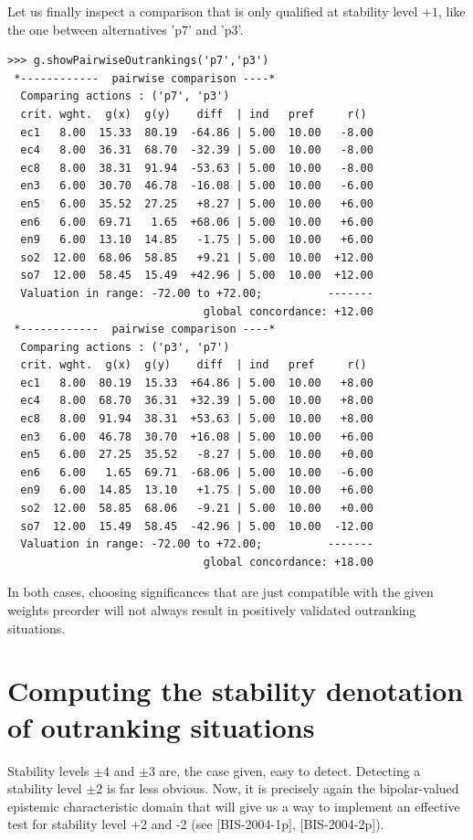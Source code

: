 Let us finally inspect a comparison that is only qualified at stability level $+1$, like the one between alternatives 'p7' and 'p3'.
\begin{lstlisting}[caption={Comparison of alternatives 'p7' and 'p3'},label=list:19.6]
>>> g.showPairwiseOutrankings('p7','p3')
 *------------  pairwise comparison ----*
  Comparing actions : ('p7', 'p3')
  crit. wght.  g(x)  g(y)    diff  | ind   pref     r()
  ec1   8.00  15.33  80.19  -64.86 | 5.00  10.00   -8.00
  ec4   8.00  36.31  68.70  -32.39 | 5.00  10.00   -8.00
  ec8   8.00  38.31  91.94  -53.63 | 5.00  10.00   -8.00
  en3   6.00  30.70  46.78  -16.08 | 5.00  10.00   -6.00
  en5   6.00  35.52  27.25   +8.27 | 5.00  10.00   +6.00
  en6   6.00  69.71   1.65  +68.06 | 5.00  10.00   +6.00
  en9   6.00  13.10  14.85   -1.75 | 5.00  10.00   +6.00
  so2  12.00  68.06  58.85   +9.21 | 5.00  10.00  +12.00
  so7  12.00  58.45  15.49  +42.96 | 5.00  10.00  +12.00
  Valuation in range: -72.00 to +72.00;          -------
                              global concordance: +12.00
 *------------  pairwise comparison ----*
  Comparing actions : ('p3', 'p7')
  crit. wght.  g(x)  g(y)    diff  | ind   pref     r()
  ec1   8.00  80.19  15.33  +64.86 | 5.00  10.00   +8.00
  ec4   8.00  68.70  36.31  +32.39 | 5.00  10.00   +8.00
  ec8   8.00  91.94  38.31  +53.63 | 5.00  10.00   +8.00
  en3   6.00  46.78  30.70  +16.08 | 5.00  10.00   +6.00
  en5   6.00  27.25  35.52   -8.27 | 5.00  10.00   +0.00
  en6   6.00   1.65  69.71  -68.06 | 5.00  10.00   -6.00
  en9   6.00  14.85  13.10   +1.75 | 5.00  10.00   +6.00
  so2  12.00  58.85  68.06   -9.21 | 5.00  10.00   +0.00
  so7  12.00  15.49  58.45  -42.96 | 5.00  10.00  -12.00
  Valuation in range: -72.00 to +72.00;          -------
                              global concordance: +18.00
\end{lstlisting}
In both cases, choosing significances that are just compatible with the given weights preorder will not always result in positively validated  outranking situations.

\section[Computing stability denotations]{Computing the stability denotation of outranking situations}
\label{sec:19.3}

Stability levels $\pm 4$ and $\pm 3$ are, the case given, easy to detect. Detecting a stability level $\pm 2$ is far less obvious.  Now, it is precisely again the bipolar-valued epistemic characteristic domain that will give us a way to implement an effective test for stability level +2 and -2 (see [BIS-2004-1p], [BIS-2004-2p]). 

